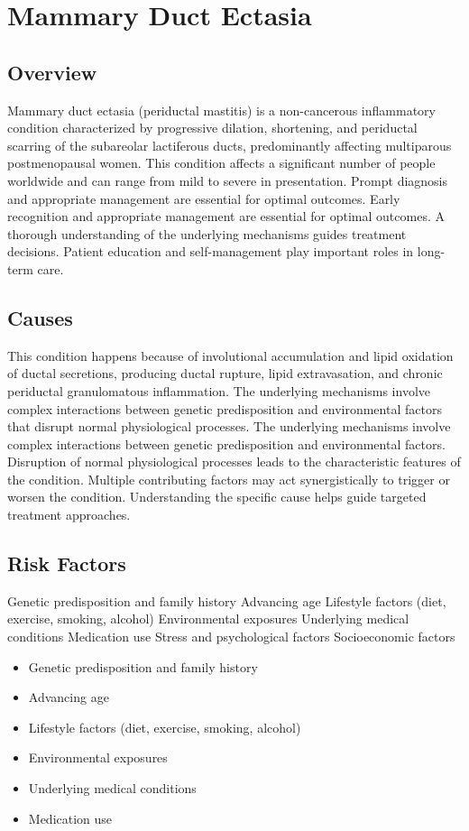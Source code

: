 \chapter{Mammary Duct Ectasia}
\label{sec:Mammary Duct Ectasia}

\section{Overview}
Mammary duct ectasia (periductal mastitis) is a non-cancerous inflammatory condition characterized by progressive dilation, shortening, and periductal scarring of the subareolar lactiferous ducts, predominantly affecting multiparous postmenopausal women. This condition affects a significant number of people worldwide and can range from mild to severe in presentation. Prompt diagnosis and appropriate management are essential for optimal outcomes. Early recognition and appropriate management are essential for optimal outcomes. A thorough understanding of the underlying mechanisms guides treatment decisions. Patient education and self-management play important roles in long-term care.
\section{Causes}
This condition happens because of involutional accumulation and lipid oxidation of ductal secretions, producing ductal rupture, lipid extravasation, and chronic periductal granulomatous inflammation. The underlying mechanisms involve complex interactions between genetic predisposition and environmental factors that disrupt normal physiological processes. The underlying mechanisms involve complex interactions between genetic predisposition and environmental factors. Disruption of normal physiological processes leads to the characteristic features of the condition. Multiple contributing factors may act synergistically to trigger or worsen the condition. Understanding the specific cause helps guide targeted treatment approaches.
\section{Risk Factors}
Genetic predisposition and family history Advancing age Lifestyle factors (diet, exercise, smoking, alcohol) Environmental exposures Underlying medical conditions Medication use Stress and psychological factors Socioeconomic factors

\begin{itemize}[noitemsep]
  \item Genetic predisposition and family history
  \item Advancing age
  \item Lifestyle factors (diet, exercise, smoking, alcohol)
  \item Environmental exposures
  \item Underlying medical conditions
  \item Medication use
\end{itemize}
